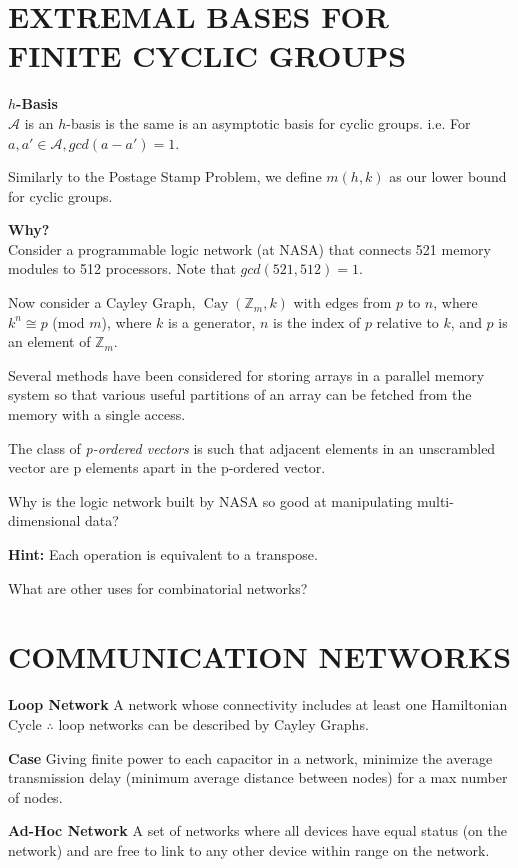 \documentclass[a4paper,10pt,english]{sphinxhowto}
\def\A{{\mathcal A}}
\begin{document}
\newpage

\section*{EXTREMAL BASES FOR FINITE CYCLIC GROUPS}
\label{index:cyclic-groups}

\textbf{$h$-Basis}\\
$\A$ is an $h$-basis is the same is an asymptotic basis for cyclic groups.
i.e. For $a, a' \in \A, gcd(a - a') = 1$.

Similarly to the Postage Stamp Problem, we define $m(h, k)$ as our lower bound for cyclic groups.

\textbf{Why?}\\
Consider a programmable logic network (at NASA) that connects 521 memory modules to 512 processors. Note that $gcd(521, 512) = 1$.

Now consider a Cayley Graph, $\operatorname{Cay}(\mathbb{Z}_{m}, k)$ with edges from $p$ to $n$, where $k^{n} \cong p$ (mod $m$), where $k$ is a generator, $n$ is the index of $p$ relative to $k$, and $p$ is an element of $\mathbb{Z}_{m}$.

Several methods have been considered for storing arrays in a parallel memory system so that various useful partitions of an array can be fetched from the memory with a single access.

The class of \emph{p-ordered vectors} is such that adjacent elements in an unscrambled vector are p elements apart in the p-ordered vector.

Why is the logic network built by NASA so good at manipulating multi-dimensional data?

\textbf{Hint:} Each operation is equivalent to a transpose.

What are other uses for combinatorial networks?

\newpage
\section*{COMMUNICATION NETWORKS}

\textbf{Loop Network}
A network whose connectivity includes at least one Hamiltonian Cycle $\therefore$ loop networks can be described by Cayley Graphs.

\textbf{Case}
Giving finite power to each capacitor in a network, minimize the average transmission delay (minimum average distance between nodes) for a max number of nodes.

\textbf{Ad-Hoc Network}
A set of networks where all devices have equal status (on the network) and are free to link to any other device within range on the network.
\end{document}
